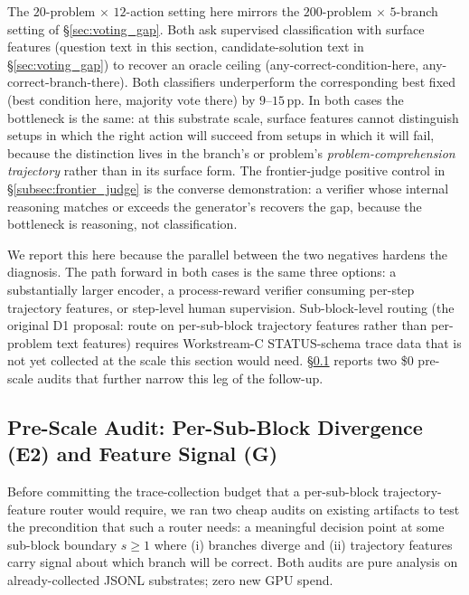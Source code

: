 The $20$-problem $\times$ $12$-action setting here mirrors the
$200$-problem $\times$ $5$-branch setting of
\S\ref{sec:voting_gap}.  Both ask supervised classification with
surface features (question text in this section, candidate-solution
text in \S\ref{sec:voting_gap}) to recover an oracle ceiling
(any-correct-condition-here, any-correct-branch-there).  Both
classifiers underperform the corresponding best fixed (best
condition here, majority vote there) by $9\text{--}15$\,pp.  In
both cases the bottleneck is the same: at this substrate scale,
surface features cannot distinguish setups in which the right
action will succeed from setups in which it will fail, because the
distinction lives in the branch's or problem's
\emph{problem-comprehension trajectory} rather than in its surface
form.  The frontier-judge positive control in
\S\ref{subsec:frontier_judge} is the converse demonstration: a
verifier whose internal reasoning matches or exceeds the
generator's recovers the gap, because the bottleneck is reasoning,
not classification.

We report this here because the parallel between the two negatives
hardens the diagnosis.  The path forward in both cases is the same
three options: a substantially larger encoder, a process-reward
verifier consuming per-step trajectory features, or step-level
human supervision.  Sub-block-level routing (the original D1
proposal: route on per-sub-block trajectory features rather than
per-problem text features) requires Workstream-C STATUS-schema
trace data that is not yet collected at the scale this section
would need.  \S\ref{subsec:mode_router_pre_scale} reports two
\$0 pre-scale audits that further narrow this leg of the
follow-up.

\subsection{Pre-Scale Audit: Per-Sub-Block Divergence (E2) and Feature Signal (G)}
\label{subsec:mode_router_pre_scale}

Before committing the trace-collection budget that a per-sub-block
trajectory-feature router would require, we ran two cheap
audits on existing artifacts to test the precondition that such a
router needs: a meaningful decision point at some sub-block
boundary $s \geq 1$ where (i) branches diverge and (ii) trajectory
features carry signal about which branch will be correct.  Both
audits are pure analysis on already-collected JSONL substrates;
zero new GPU spend.

